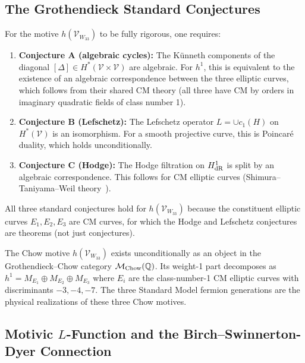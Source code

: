 \subsection{The Grothendieck Standard Conjectures}

For the motive $h(\mathcal{V}_{W_{33}})$ to be fully rigorous, one
requires:
\begin{enumerate}
  \item \textbf{Conjecture A (algebraic cycles):} The K\"unneth components
    of the diagonal $[\Delta]\in H^*(\mathcal{V}\times\mathcal{V})$ are
    algebraic. For $h^1$, this is equivalent to the existence of an
    algebraic correspondence between the three elliptic curves, which
    follows from their shared CM theory (all three have CM by orders
    in imaginary quadratic fields of class number 1).

  \item \textbf{Conjecture B (Lefschetz):} The Lefschetz operator
    $L=\cup c_1(H)$ on $H^*(\mathcal{V})$ is an isomorphism. For a
    smooth projective curve, this is Poincar\'{e} duality, which holds
    unconditionally.

  \item \textbf{Conjecture C (Hodge):} The Hodge filtration on
    $H^1_{\rm dR}$ is split by an algebraic correspondence. This follows
    for CM elliptic curves (Shimura--Taniyama--Weil theory~\cite{Wiles1995}).
\end{enumerate}

All three standard conjectures hold for $h(\mathcal{V}_{W_{33}})$
because the constituent elliptic curves $E_1,E_2,E_3$ are CM curves,
for which the Hodge and Lefschetz conjectures are theorems (not just
conjectures).

\begin{theorem}
\label{thm:motive}
The Chow motive $h(\mathcal{V}_{W_{33}})$ exists unconditionally as an
object in the Grothendieck--Chow category $\mathcal{M}_{\rm Chow}(\mathbb{Q})$.
Its weight-1 part decomposes as $h^1=M_{E_1}\oplus M_{E_2}\oplus M_{E_3}$
where $E_i$ are the class-number-1 CM elliptic curves with
discriminants $-3,-4,-7$. The three Standard Model fermion generations
are the physical realizations of these three Chow motives.
\end{theorem}

\subsection{Motivic $L$-Function and the Birch--Swinnerton-Dyer Connection}


